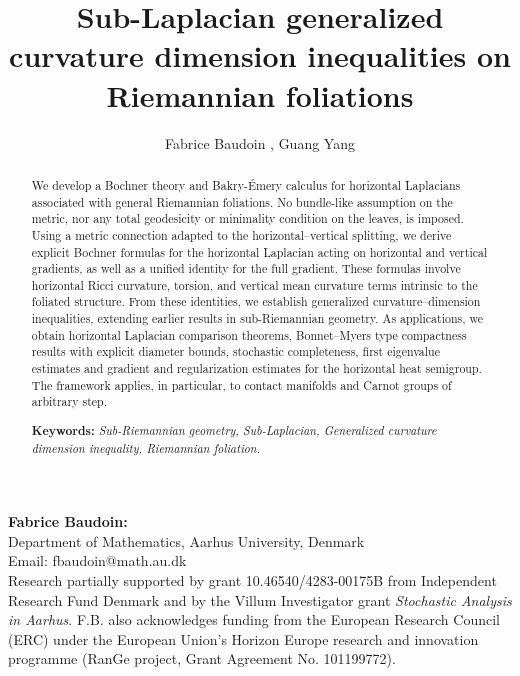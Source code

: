 \documentclass[11pt]{article}
\title{Sub-Laplacian generalized curvature dimension inequalities on Riemannian foliations}
\author{Fabrice Baudoin
	, Guang Yang}
\numberwithin{equation}{section}
\begin{document}
	
	\maketitle
	
	\newcommand\blfootnote[1]{%
		\begingroup
		\renewcommand\thefootnote{}\footnote{#1}%
		\addtocounter{footnote}{-1}%
		\endgroup
	}
	
	
	
	\begin{abstract}
    We develop a Bochner theory and Bakry-\'Emery calculus for horizontal Laplacians associated with general Riemannian foliations. No bundle-like assumption on the metric, nor any total geodesicity or minimality condition on the leaves, is imposed. Using a metric connection adapted to the horizontal–vertical splitting, we derive explicit Bochner formulas for the horizontal Laplacian acting on horizontal and vertical gradients, as well as a unified identity for the full gradient. These formulas involve horizontal Ricci curvature, torsion, and vertical mean curvature terms intrinsic to the foliated structure.
From these identities, we establish generalized curvature–dimension inequalities, extending earlier results in sub-Riemannian geometry. As applications, we obtain horizontal Laplacian comparison theorems, Bonnet–Myers type compactness results with explicit diameter bounds, stochastic completeness, first eigenvalue estimates and gradient and regularization estimates for the horizontal heat semigroup. The framework applies, in particular, to contact manifolds and Carnot groups of arbitrary step.

\vspace{15pt}

\noindent \textbf{Keywords:} \emph{Sub-Riemannian geometry, Sub-Laplacian, Generalized curvature dimension inequality, Riemannian foliation.}

	\end{abstract}

    
\vspace{10pt}
\noindent
\begin{minipage}{\textwidth}
    \small
    \textbf{Fabrice Baudoin:} \\
    Department of Mathematics, Aarhus University, Denmark \\
    Email: fbaudoin@math.au.dk \\
    Research partially supported by grant 10.46540/4283-00175B from Independent Research Fund Denmark and by the Villum Investigator grant \emph{Stochastic Analysis in Aarhus}. F.B. also acknowledges funding from the European Research Council (ERC) under the European Union’s Horizon Europe research and innovation programme (RanGe project, Grant Agreement No. 101199772).
\end{minipage}
\end{document}
